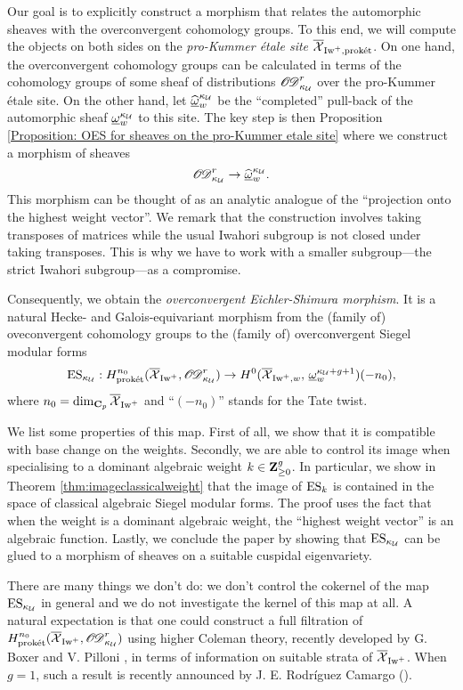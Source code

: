 Our goal is to explicitly construct a morphism that relates the automorphic sheaves with the overconvergent cohomology groups. To this end, we will compute the objects on both sides on the \emph{pro-Kummer \'etale site} $\overline{\operatorname{\mathcal{X}}}_{\operatorname{Iw}^+, \operatorname{\textrm{prok\'{e}t}}}$. On one hand, the overconvergent cohomology groups can be calculated in terms of the cohomology groups of some sheaf of distributions $\operatorname{\operatorname{\mathscr{O}}\!\!\operatorname{\mathscr{D}}}_{\kappa_{\operatorname{\mathcal{U}}}}^r$ over the pro-Kummer \'etale site. On the other hand, let $\widehat{\underline{\omega}}_{w}^{\kappa_{\operatorname{\mathcal{U}}}}$ be the ``completed'' pull-back of the automorphic sheaf $\underline{\omega}_w^{\kappa_{\operatorname{\mathcal{U}}}}$ to this site. The key step is then Proposition \ref{Proposition: OES for sheaves on the pro-Kummer etale site} where we construct a morphism of sheaves
\[
\operatorname{\operatorname{\mathscr{O}}\!\!\operatorname{\mathscr{D}}}_{\kappa_{\operatorname{\mathcal{U}}}}^r\rightarrow \widehat{\underline{\omega}}_{w}^{\kappa_{\operatorname{\mathcal{U}}}}.
\]
This morphism can be thought of as an analytic analogue of the ``projection onto the highest weight vector''. We remark that the construction involves taking transposes of matrices while the usual Iwahori subgroup is not closed under taking transposes. This is why we have to work with a smaller subgroup---the strict Iwahori subgroup---as a compromise.

Consequently, we obtain the \emph{overconvergent Eichler-Shimura morphism}. It is a natural Hecke- and Galois-equivariant morphism from the (family of) oveconvergent cohomology groups to the (family of) overconvergent Siegel modular forms
\[
    \operatorname{ES}_{\kappa_{\operatorname{\mathcal{U}}}}: H_{\operatorname{\textrm{prok\'{e}t}}}^{n_0}(\overline{\operatorname{\mathcal{X}}}_{\operatorname{Iw}^+}, \operatorname{\operatorname{\mathscr{O}}\!\!\operatorname{\mathscr{D}}}_{\kappa_{\operatorname{\mathcal{U}}}}^r) \rightarrow H^0(\overline{\operatorname{\mathcal{X}}}_{\operatorname{Iw}^+, w}, \,\underline{\omega}_w^{\kappa_{\operatorname{\mathcal{U}}}+g+1})(-n_0),
\] where $n_0 = \dim_{\operatorname{\mathbf{C}}_p} \overline{\operatorname{\mathcal{X}}}_{\operatorname{Iw}^+}$ and ``$(-n_0)$'' stands for the Tate twist.

We list some properties of this map. First of all, we show that it is compatible with base change on the weights. Secondly, we are able to control its image when specialising to a dominant algebraic weight $k\in \operatorname{\mathbf{Z}}_{\geq 0}^{g}$. In particular, we show in Theorem \ref{thm:imageclassicalweight} that the image of $\operatorname{ES}_{k}$ is contained in the space of classical algebraic Siegel modular forms. The proof uses the fact that when the weight is a dominant algebraic weight, the ``highest weight vector'' is an algebraic function. Lastly, we conclude the paper by showing that $\operatorname{ES}_{\kappa_{\operatorname{\mathcal{U}}}}$ can be glued to a morphism of sheaves on a suitable cuspidal eigenvariety.

There are many things we don't do: we don't control the cokernel of the map $\operatorname{ES}_{\kappa_{\operatorname{\mathcal{U}}}}$ in general and we do not investigate the kernel of this map at all. A natural expectation is that one could construct a full filtration of $H_{\operatorname{\textrm{prok\'{e}t}}}^{n_0}(\overline{\operatorname{\mathcal{X}}}_{\operatorname{Iw}^+}, \operatorname{\operatorname{\mathscr{O}}\!\!\operatorname{\mathscr{D}}}_{\kappa_{\operatorname{\mathcal{U}}}}^r) $ using higher Coleman theory, recently developed by G. Boxer and V. Pilloni \cite{Boxer--Pilloni--higherColeman}, in terms of information on suitable strata of $\overline{\operatorname{\mathcal{X}}}_{\operatorname{Iw}^+}$. When $g=1$, such a result is recently announced by J. E. Rodr\'iguez Camargo (\cite{Rodriguez-dualOES}).

